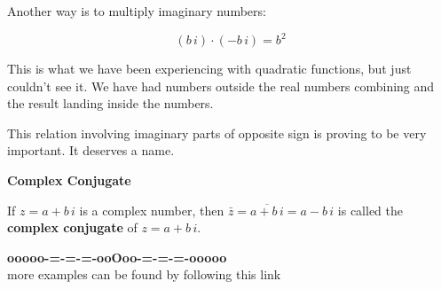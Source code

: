 \documentclass{ximera}
\begin{document}
Another way is to multiply imaginary numbers:

\[
(b \, i) \cdot (-b \, i) = b^2
\]



This is what we have been experiencing with quadratic functions, but just couldn't see it.  We have had numbers outside the real numbers combining and the result landing inside the numbers.




This relation involving imaginary parts of opposite sign is proving to be very important.  It deserves a name.



\begin{definition} \textbf{\textcolor{green!50!black}{Complex Conjugate}}

If $z = a + b \, i$ is a complex number, then $\bar{z} = \overline{a + b \, i} = a - b \, i$ is called the \textbf{complex conjugate} of $z = a + b \, i$.

\end{definition}
















\begin{center}
\textbf{\textcolor{green!50!black}{ooooo-=-=-=-ooOoo-=-=-=-ooooo}} \\

more examples can be found by following this link\\ 

\end{center}
\end{document}
